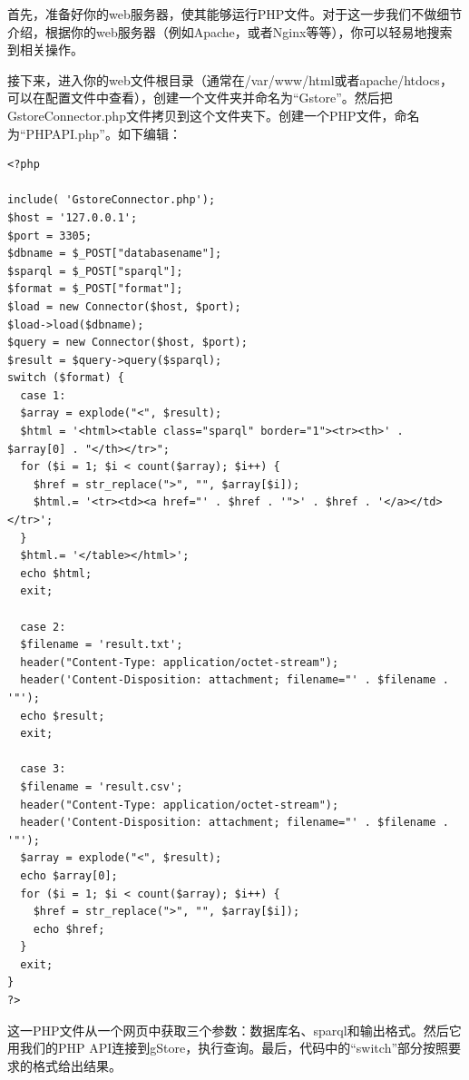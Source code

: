 \documentclass[titlepage, a4paper, 12pt]{article}
\begin{document}
首先，准备好你的web服务器，使其能够运行PHP文件。对于这一步我们不做细节介绍，根据你的web服务器（例如Apache，或者Nginx等等），你可以轻易地搜索到相关操作。

接下来，进入你的web文件根目录（通常在/var/www/html或者apache/htdocs，可以在配置文件中查看），创建一个文件夹并命名为“Gstore”。然后把GstoreConnector.php文件拷贝到这个文件夹下。创建一个PHP文件，命名为“PHPAPI.php”。如下编辑：

\begin{verbatim}
<?php

include( 'GstoreConnector.php');
$host = '127.0.0.1';
$port = 3305;
$dbname = $_POST["databasename"];
$sparql = $_POST["sparql"];
$format = $_POST["format"];
$load = new Connector($host, $port);
$load->load($dbname);
$query = new Connector($host, $port);
$result = $query->query($sparql);
switch ($format) {
  case 1:
  $array = explode("<", $result);
  $html = '<html><table class="sparql" border="1"><tr><th>' . $array[0] . "</th></tr>";
  for ($i = 1; $i < count($array); $i++) {
    $href = str_replace(">", "", $array[$i]);
    $html.= '<tr><td><a href="' . $href . '">' . $href . '</a></td></tr>';
  }
  $html.= '</table></html>';
  echo $html;
  exit;

  case 2:
  $filename = 'result.txt';
  header("Content-Type: application/octet-stream");
  header('Content-Disposition: attachment; filename="' . $filename . '"');
  echo $result;
  exit;

  case 3:
  $filename = 'result.csv';
  header("Content-Type: application/octet-stream");
  header('Content-Disposition: attachment; filename="' . $filename . '"');
  $array = explode("<", $result);
  echo $array[0];
  for ($i = 1; $i < count($array); $i++) {
    $href = str_replace(">", "", $array[$i]);
    echo $href;
  }
  exit;
}
?>
\end{verbatim}

这一PHP文件从一个网页中获取三个参数：数据库名、sparql和输出格式。然后它用我们的PHP API连接到gStore，执行查询。最后，代码中的“switch”部分按照要求的格式给出结果。 
\end{document}
